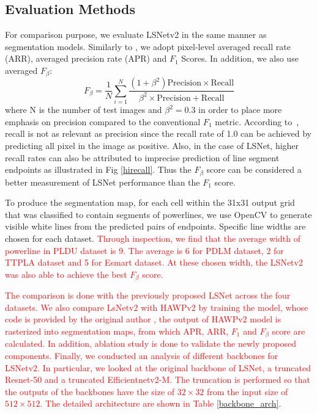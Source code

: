 \documentclass[journal]{IEEEtran}
\begin{document}
\subsection{Evaluation Methods}
For comparison purpose, we evaluate LSNetv2 in the same manner as segmentation models.
Similarly to \cite{Nguyen2020}, we adopt pixel-level averaged recall rate (ARR), averaged precision rate (APR) and $F_1$ Scores. In addition, we also use averaged $F_{\beta}$:
\begin{equation}
  F_{\beta} = \frac{1}{N} \sum_{i=1}^N  \frac{(1 + \beta^2)\text{Precision} \times \text{Recall}}{\beta^2 \times \text{Precision} + \text{Recall}} 
\end{equation}
where N is the number of test images and $\beta^2 = 0.3$ in order to place more emphasis on precision compared to the conventional $F_1$ metric. According to~\cite{F03}, recall is not as relevant as precision since the recall rate of 1.0 can be achieved by predicting all pixel in the image as positive. Also, in the case of LSNet, higher recall rates can also be attributed to imprecise prediction of line segment endpoints as illustrated in Fig \ref{hirecall}. Thus the $F_{\beta}$ score can be considered a better measurement of LSNet performance than the $F_1$ score.

To produce the segmentation map, for each cell within the 31x31 output grid that was classified to contain segments of powerlines, we use OpenCV to generate visible white lines from the predicted pairs of endpoints. Specific line widths are chosen for each dataset. \textcolor{red}{Through inspection, we find that the average width of powerline in PLDU dataset is 9. The average is 6 for PDLM dataset, 2 for TTPLA dataset and 5 for Esmart dataset. At these chosen width, the LSNetv2 was also able to achieve the best $F_{\beta}$ score.} 

\textcolor{red}{The comparison is done with the previously proposed LSNet across the four datasets. We also compare LsNetv2 with HAWPv2 by training the model, whose code is provided by the original author \cite{hawpv2code}, the output of HAWPv2 model is rasterized into segmentation maps, from which APR, ARR, $F_1$ and $F_\beta$ score are calculated. In addition, ablation study is done to validate the newly proposed components. Finally, we conducted an analysis of different backbones for LSNetv2. In particular, we looked at the original backbone of LSNet, a truncated Resnet-50 \cite{resnet} and a truncated Efficientnetv2-M\cite{efficientnetv2}. The truncation is performed so that the outputs of the backbones have the size of $32 \times 32$ from the input size of $512 \times 512$. The detailed architecture are shown in Table \ref{backbone_arch}.}
\end{document}
